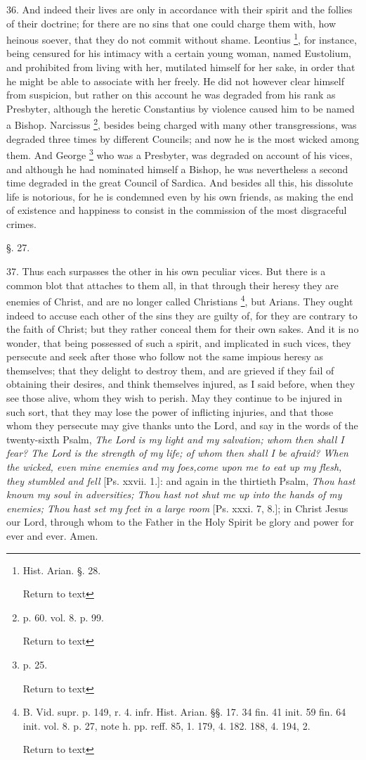 36. And indeed their lives are only in accordance
with their spirit and the follies of their doctrine; for there are no
sins that one could charge them with, how heinous soever, that
they do not commit without shame. Leontius \footnote{Hist. Arian. §. 28.

Return to text}, for instance, being censured for his intimacy with a certain
young woman, named Eustolium, and prohibited from living with her,
mutilated himself for her sake, in order that he might be able to
associate with her freely. He did not however clear himself from
suspicion, but rather on this account he was degraded from his rank as
Presbyter, although the heretic Constantius by violence caused him to
be named a Bishop. Narcissus \footnote{p. 60. vol. 8. p. 99.

Return to text},
besides being charged with many other transgressions, was degraded
three times by different Councils; and now he is the most wicked among
them. And George \footnote{p. 25.

Return to text} who was a
Presbyter, was degraded on account of his vices, and although he had
nominated himself a Bishop, he was nevertheless a second time degraded
in the great Council of Sardica. And besides all this, his dissolute
life is notorious, for he is condemned even by his own friends, as
making the end of existence and happiness to consist in the commission
of the most disgraceful crimes.

§. 27.

37. Thus each surpasses the other in his own
peculiar vices. But there is a common blot that attaches to them all,
in that through their heresy they are enemies of Christ, and are no
longer called Christians \footnote{B.
Vid. supr. p. 149, r. 4. infr. Hist. Arian. §§. 17. 34 fin. 41 init.
59 fin. 64 init. vol. 8. p. 27, note h. pp. reff. 85, 1. 179, 4. 182.
188, 4. 194, 2.

Return to text

}, but Arians.
They ought indeed to accuse each other of the sins they are guilty of,
for they are contrary to the faith of Christ; but they rather conceal
them for their own sakes. And it is no wonder, that being possessed of
such a spirit, and implicated in such vices, they persecute and seek
after those who follow not the same impious heresy as themselves; that
they delight to destroy them, and are grieved if they fail of
obtaining their desires, and think themselves injured, as I said
before, when they see those alive, whom they wish to perish. May they
continue to be injured in such sort, that they may lose the power of
inflicting injuries, and that those whom they persecute may give
thanks unto the Lord, and say in the words of the twenty-sixth Psalm, \emph{The
Lord is my light and my salvation; whom then shall I fear? The Lord is
the strength of my life; of whom then shall I be afraid? When the
wicked, even mine enemies and my foes,}\emph{come upon me to
eat up my flesh, they stumbled and fell} [Ps. xxvii. 1.]: and again
in the thirtieth Psalm, \emph{Thou hast known my soul in adversities;
Thou hast not shut me up into the hands of my enemies; Thou hast set
my feet in a large room} [Ps. xxxi. 7, 8.]; in Christ Jesus our
Lord, through whom to the Father in the Holy Spirit be glory and power
for ever and ever. Amen.

